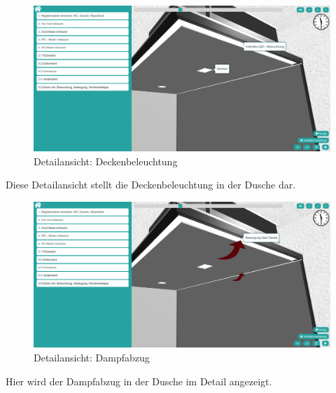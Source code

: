 \begin{figure}[h]
    \centering
    \includegraphics[width=1\linewidth]{images/screenshots/05.png}
    \caption{Detailansicht: Deckenbeleuchtung}
    \label{}
\end{figure}
\noindent Diese Detailansicht stellt die Deckenbeleuchtung in der Dusche dar.
\clearpage \newpage
\begin{figure}[h]
    \centering
    \includegraphics[width=1\linewidth]{images/screenshots/06.png}
    \caption{Detailansicht: Dampfabzug}
    \label{}
\end{figure}
\noindent Hier wird der Dampfabzug in der Dusche im Detail angezeigt.



